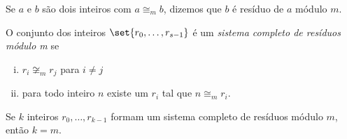 \begin{definition}
    Se $a$ e $b$ são dois inteiros com $a \cong_m b$, dizemos que $b$ é resíduo
    de $a$ módulo $m$.
\end{definition}

\begin{definition}
    O conjunto dos inteiros $\set{r_0, \dots, r_{s-1}}$ é um \emph{sistema
    completo de resíduos módulo m} se
    \begin{enumerate}[(i)]
    \item $r_i \not\cong_m r_j$ para $i \neq j$
    \item para todo inteiro $n$ existe um $r_i$ tal que $n \cong_m r_i$.
    \end{enumerate}
\end{definition}

\begin{exercise}
    Se $k$ inteiros $r_0, \dots, r_{k-1}$ formam um sistema completo de resíduos
    módulo $m$, então $k = m$.
\end{exercise}
